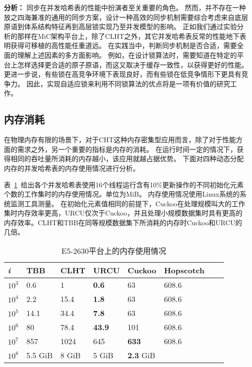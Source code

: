 \textbf{分析：} 同步在并发哈希表的性能中扮演者至关重要的角色。
然而，并不存在一种放之四海兼准的通用的同步方案，设计一种高效的同步机制需要综合考虑来自底层原语到体系结构特征再到高层锁实现乃至并发模型的影响。
正如我们通过实验分析的那样在MiC架构平台上，除了CLHT之外，其它并发哈希表反常的性能地下表明获得可移植的高性能任重道远。
在实践当中，判断同步机制是否合适，需要全面的理解上述因素的多方面影响。
例如，在设计锁算法时，需要知道在特定的平台上怎样选择更合适的原子原语，而这又取决于缓存一致性，以获得更好的性能。
更进一步说，有些锁在高竞争环境下表现良好，而有些锁在低竞争情形下更具有竞争力。
因此，实现自适应锁来利用不同锁算法的优点将是一项有价值的研究工作。

\subsection{内存消耗}
\label{sec:memory_comsume}
在物理内存有限的场景下，对于CHT这种内存密集型应用而言，除了对于性能方面的需求之外，另一个重要的指标是内存的消耗。
在运行时间一定的情况下，获得相同的吞吐量所消耗的内存越小，该应用就越占据优势。
下面对四种动态分配内存的并发哈希表的内存使用情况进行分析。

表~\ref{tab:memusage}~给出各个并发哈希表使用16个线程运行含有10\%更新操作的不同初始化元素个数的工作集时的内存使用情况。单位为MiB。
内存使用情况使用Linux系统的系统监测工具测量。
在初始化元素值相同的前提下，Cuckoo在处理规模叫大的工作集时内存效率更高，URCU仅次于Cuckoo，并且处理小规模数据集时具有更高的内存效率。CLHT和TBB在同等规模数据集下所消耗的内存时Cuckoo和URCU的几倍。


\begin{table}[htbp]
  \centering
  \caption{E5-2630平台上的内存使用情况}
  \label{tab:memusage}
  \begin{tabular}{llllllll}
    \toprule
       \textit{i}   &   TBB   &    CLHT    &  URCU     &  Cuckoo &     Hopscotch \\
    \midrule
$10^3$     & 0.6  &   1   &  \textbf{0.6}   & 63 &   608.6    \\

$10^4$     & 2.2   &  15.4   &   \textbf{1.8}    & 63  &   608.6    \\

$10^5$     & 14.1 &    34.4   &   \textbf{7.8}   & 63  &  608.6     \\

$10^6$     & 80   &  78.4    &   \textbf{43.9}   & 101 &  608.6       \\

 $10^7$    &  857  &   1024   &   645    & \textbf{633} &  608.6     \\

 $10^8$    &  5.5 GiB  &   8 GiB   &   5 GiB    & \textbf{2.3} GiB &       \\
    \bottomrule
  \end{tabular}
\end{table}

